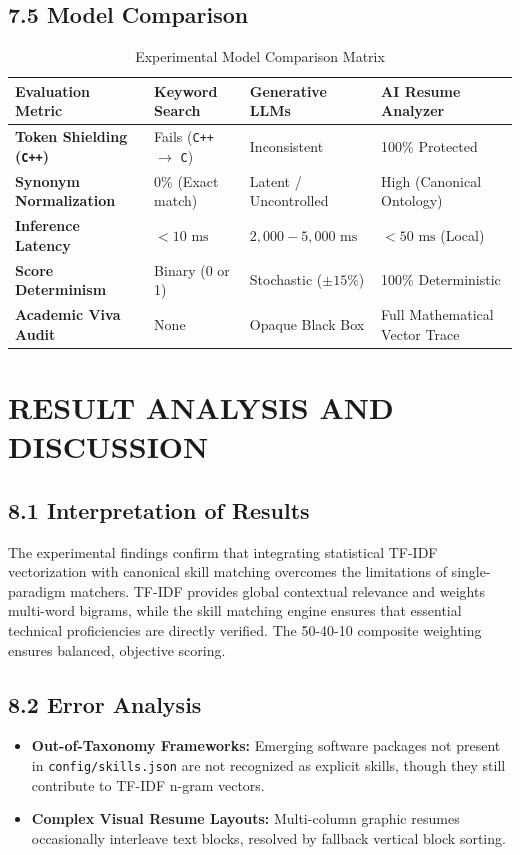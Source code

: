 \documentclass[11pt,a4paper]{article}
\begin{document}
\subsection{7.5 Model Comparison}
\begin{table}[h!]
\centering
\small
\begin{tabularx}{\textwidth}{lXXX}
\toprule
\textbf{Evaluation Metric} & \textbf{Keyword Search} & \textbf{Generative LLMs} & \textbf{AI Resume Analyzer} \\
\midrule
\textbf{Token Shielding (\texttt{C++})} & Fails (\texttt{C++} $\to$ \texttt{C}) & Inconsistent & 100\% Protected \\
\textbf{Synonym Normalization} & 0\% (Exact match) & Latent / Uncontrolled & High (Canonical Ontology) \\
\textbf{Inference Latency} & $< 10\text{ ms}$ & $2,000 - 5,000\text{ ms}$ & $< 50\text{ ms}$ (Local) \\
\textbf{Score Determinism} & Binary (0 or 1) & Stochastic ($\pm 15\%$) & 100\% Deterministic \\
\textbf{Academic Viva Audit} & None & Opaque Black Box & Full Mathematical Vector Trace \\
\bottomrule
\end{tabularx}
\caption{Experimental Model Comparison Matrix}
\end{table}

\newpage

\section{RESULT ANALYSIS AND DISCUSSION}

\subsection{8.1 Interpretation of Results}
The experimental findings confirm that integrating statistical TF-IDF vectorization with canonical skill matching overcomes the limitations of single-paradigm matchers. TF-IDF provides global contextual relevance and weights multi-word bigrams, while the skill matching engine ensures that essential technical proficiencies are directly verified. The 50-40-10 composite weighting ensures balanced, objective scoring.

\subsection{8.2 Error Analysis}
\begin{itemize}[noitemsep]
    \item \textbf{Out-of-Taxonomy Frameworks:} Emerging software packages not present in \texttt{config/skills.json} are not recognized as explicit skills, though they still contribute to TF-IDF n-gram vectors.
    \item \textbf{Complex Visual Resume Layouts:} Multi-column graphic resumes occasionally interleave text blocks, resolved by fallback vertical block sorting.
\end{itemize}
\end{document}
